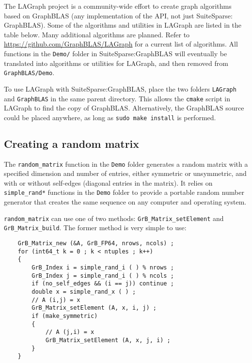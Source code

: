 \documentclass[12pt]{article}
\begin{document}
The LAGraph project is a community-wide effort to create graph algorithms based
on GraphBLAS (any implementation of the API, not just SuiteSparse: GraphBLAS).
Some of the algorithms and utilities in LAGraph are listed in the table below.
Many additional algorithms are planned.  Refer to
\url{https://github.com/GraphBLAS/LAGraph} for a current list of algorithms. All
functions in the \verb'Demo/' folder in SuiteSparse:GraphBLAS will eventually
be translated into algorithms or utilities for LAGraph, and then removed
from \verb'GraphBLAS/Demo'.

To use LAGraph with SuiteSparse:GraphBLAS, place the two folders \verb'LAGraph'
and \verb'GraphBLAS' in the same parent directory.  This allows the
\verb'cmake' script in LAGraph to find the copy of GraphBLAS.  Alternatively,
the GraphBLAS source could be placed anywhere, as long as
\verb'sudo make install' is performed.

\subsection{Creating a random matrix}
\label{random}

The \verb'random_matrix' function in the \verb'Demo' folder generates a random
matrix with a specified dimension and number of entries, either symmetric or
unsymmetric, and with or without self-edges (diagonal entries in the matrix).
It relies on \verb'simple_rand*' functions in the \verb'Demo' folder to provide
a portable random number generator that creates the same sequence on any
computer and operating system.

\verb'random_matrix' can use one of two methods: \verb'GrB_Matrix_setElement'
and \verb'GrB_Matrix_build'.  The former method is very simple to use:

    {\footnotesize
    \begin{verbatim}
    GrB_Matrix_new (&A, GrB_FP64, nrows, ncols) ;
    for (int64_t k = 0 ; k < ntuples ; k++)
    {
        GrB_Index i = simple_rand_i ( ) % nrows ;
        GrB_Index j = simple_rand_i ( ) % ncols ;
        if (no_self_edges && (i == j)) continue ;
        double x = simple_rand_x ( ) ;
        // A (i,j) = x
        GrB_Matrix_setElement (A, x, i, j) ;
        if (make_symmetric)
        {
            // A (j,i) = x
            GrB_Matrix_setElement (A, x, j, i) ;
        }
    } \end{verbatim}}
\end{document}
